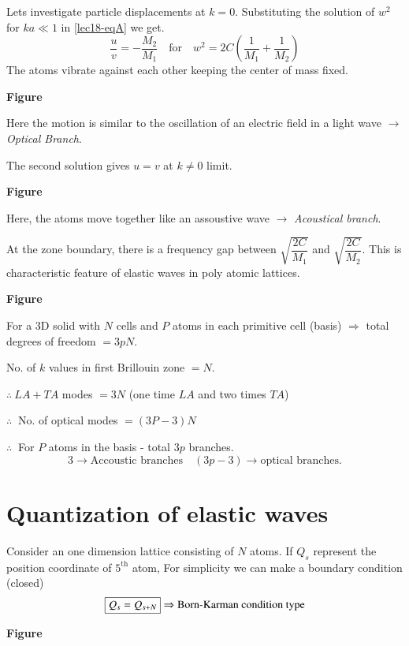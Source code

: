 Lets investigate particle displacements at $k=0$. Substituting the solution of $w^{2}$ for $ka\ll 1$ in \eqref{lec18-eqA} we get.
$$
\dfrac{u}{v}=-\dfrac{M_{2}}{M_{1}}\quad \text{for}\quad w^{2}=2C\left(\frac{1}{M_{1}}+\dfrac{1}{M_{2}}\right)
$$
The atoms vibrate against each other keeping the center of mass fixed.
\begin{center}
{\bf Figure}
\end{center}
Here the motion is similar to the oscillation of an electric field in a light wave $\to$ {\em Optical Branch}.

The second solution gives $u=v$ at $k\neq 0$ limit.
\begin{center}
{\bf Figure}
\end{center}

Here, the atoms move together like an assoustive wave $\to$ {\em Acoustical branch}.

At the zone boundary, there is a frequency gap between $\sqrt{\dfrac{2C}{M_{1}}}$ and $\sqrt{\dfrac{2C}{M_{2}}}$. This is characteristic feature of elastic waves in poly atomic lattices.
\begin{center}
{\bf Figure}
\end{center}

For a 3D solid with $N$ cells and $P$ atoms in each primitive cell (basis) $\Rightarrow$ total degrees of freedom $=3pN$.

No. of $k$ values in first Brillouin zone $=N$.

$\therefore \ LA+TA$ modes $=3N$ (one time $LA$ and two times $TA$)

$\therefore \ $ No. of optical modes $=(3P-3)N$

$\therefore \ $ For $P$ atoms in the basis - total $3p$ branches.
$$
3\to \text{Accoustic branches}\quad (3p-3) \to \text{optical branches.}
$$

\section*{Quantization of elastic waves}

Consider an one dimension lattice consisting of $N$ atoms. If $Q_{s}$ represent the position coordinate of $5^{\text{th}}$ atom, For simplicity we can make a boundary condition (closed)
$$
\fbox{$Q_{s}=Q_{s+N}$} \Rightarrow \text{Born-Karman condition type}
$$
\begin{center}
{\bf Figure}
\end{center}

